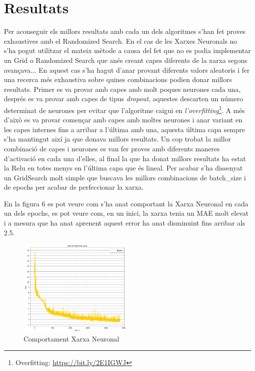 \documentclass[10pt,a4paper,twocolumn,twoside]{article}
\begin{document}
\section{Resultats}
Per aconseguir els millors resultats amb cada un dels algoritmes s'han fet proves exhaustives amb el Randomized Search. En el cas de les Xarxes Neuronals no s'ha pogut utilitzar el mateix mètode a causa del fet que no es podia implementar un Grid o Randomized Search que anés creant capes diferents de la xarxa segons avançava... En aquest cas s'ha hagut d'anar provant diferents valors aleatoris i fer una recerca més exhaustiva sobre quines combinacions podien donar millors resultats. Primer es va provar amb capes amb molt poques neurones cada una, després es va provar amb capes de tipus \textit{dropout}, aquestes descarten un número determinat de neurones per evitar que l'algoritme caigui en \textit{l'overfitting}\footnote{Overfitting:      \url{https://bit.ly/2E1IGWJ}}. A més d'això es va provar començar amb capes amb moltes neurones i anar variant en les capes internes fins a arribar a l'última amb una, aquesta última capa sempre s'ha mantingut així ja que donava millors resultats. Un cop trobat la millor combinació de capes i neurones es van fer proves amb diferents maneres d'activació en cada una d'elles, al final la que ha donat millors resultats ha estat la Relu en totes menys en l'última capa que és lineal. Per acabar s'ha dissenyat un GridSearch molt simple que buscava les millors combinacions de batch\_size i de epochs per acabar de perfeccionar la xarxa. 

En la figura 6 es pot veure com s'ha anat comportant la Xarxa Neuronal en cada un dels epochs, es pot veure com, en un inici, la xarxa tenia un MAE molt elevat i a mesura que ha anat aprenent aquest error ha anat disminuint fins arribar als 2.5.
\begin{figure}[!h]
\centering
	\includegraphics[width=0.5\textwidth]{../img/analisiNN}
	\caption{Comportament Xarxa Neuronal}
	\label{fig-analisiNN}
\end{figure}
\end{document}
